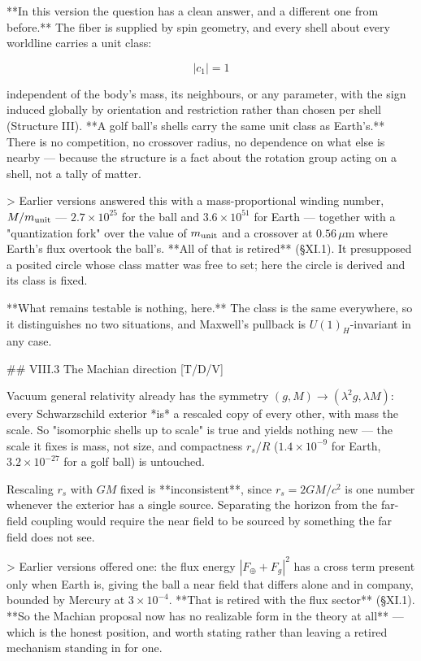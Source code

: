 **In this version the question has a clean answer, and a different one from before.** The fiber is supplied by spin geometry, and every shell about every worldline carries a unit class:

$$|c_1| = 1$$

independent of the body's mass, its neighbours, or any parameter, with the sign induced globally by orientation and restriction rather than chosen per shell (Structure III). **A golf ball's shells carry the same unit class as Earth's.** There is no competition, no crossover radius, no dependence on what else is nearby — because the structure is a fact about the rotation group acting on a shell, not a tally of matter.

> Earlier versions answered this with a mass-proportional winding number, $M/m_{\rm unit}$ — $2.7\times10^{25}$ for the ball and $3.6\times10^{51}$ for Earth — together with a "quantization fork" over the value of $m_{\rm unit}$ and a crossover at $0.56\,\mu$m where Earth's flux overtook the ball's. **All of that is retired** (§XI.1). It presupposed a posited circle whose class matter was free to set; here the circle is derived and its class is fixed.

**What remains testable is nothing, here.** The class is the same everywhere, so it distinguishes no two situations, and Maxwell's pullback is $U(1)_H$-invariant in any case.

## VIII.3 The Machian direction [T/D/V]

Vacuum general relativity already has the symmetry $(g,M)\to(\lambda^2g,\lambda M)$: every Schwarzschild exterior *is* a rescaled copy of every other, with mass the scale. So "isomorphic shells up to scale" is true and yields nothing new — the scale it fixes is mass, not size, and compactness $r_s/R$ ($1.4\times10^{-9}$ for Earth, $3.2\times10^{-27}$ for a golf ball) is untouched.

Rescaling $r_s$ with $GM$ fixed is **inconsistent**, since $r_s = 2GM/c^2$ is one number whenever the exterior has a single source. Separating the horizon from the far-field coupling would require the near field to be sourced by something the far field does not see.

> Earlier versions offered one: the flux energy $|F_\oplus+F_g|^2$ has a cross term present only when Earth is, giving the ball a near field that differs alone and in company, bounded by Mercury at $3\times10^{-4}$. **That is retired with the flux sector** (§XI.1). **So the Machian proposal now has no realizable form in the theory at all** — which is the honest position, and worth stating rather than leaving a retired mechanism standing in for one.

